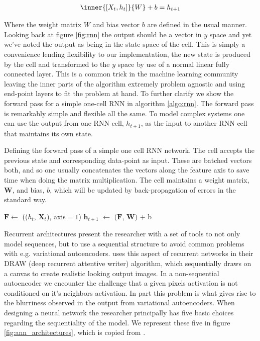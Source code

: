 \begin{align}\label{eq:rnn}
\inner{[X_t, h_t]}{W} + b = h_{t+1}
\end{align}

\noindent Where the weight matrix $W$ and bias vector $b$ are defined in the usual manner. Looking back at figure \ref{fig:rnn} the output should be a vector in $y$ space and yet we've noted the output as being in the state space of the cell. This is simply a convenience lending flexibility to our implementation, the new state is produced by the cell and transformed to the $y$ space by use of a normal linear fully connected layer. This is a common trick in the machine learning community leaving the inner parts of the algorithm extremely problem agnostic and using end-point layers to fit the problem at hand. To further clarify we show the forward pass for a simple one-cell RNN in algorithm \ref{algo:rnn}. The forward pass is remarkably simple and flexible all the same. To model complex systems one can use the output from one RNN cell, $h_{t+1}$, as the input to another RNN cell that maintains its own state. 

\begin{algorithm}[H]
\SetAlgoLined
\caption{Defining the forward pass of a simple one cell RNN network. The cell accepts the previous state and corresponding data-point as input. These are batched vectors both, and so one usually concatenates the vectors along the feature axis to save time when doing the matrix multiplication. The cell maintains a weight matrix, $\mathbf{W}$, and bias, $b$, which will be updated by back-propagation of errors in the standard way.}\label{algo:rnn}
$\mathbf{F} \gets$ (($h_t$, $\mathbf{X}_t$), axis$=1$)\;
$\mathbf{h}_{t+1}$ $\gets$ ($\mathbf{F}$, $\mathbf{W}$) + b\;
\end{algorithm}

\noindent Recurrent architectures present the researcher with a set of tools to not only model sequences, but to use a sequential structure to avoid common problems with e.g. variational autoencoders. \citet{Gregor2015} uses this aspect of recurrent networks in their DRAW (deep recurrent attentive writer) algorithm, which sequentially draws on a canvas to create realistic looking output images. In a non-sequential autoencoder we encounter the challenge that a given pixels activation is not conditioned on it's neighbors activation. In part this problem is what gives rise to the blurriness observed in the output from variational autoencoders. When designing a neural network the researcher principally has five basic choices regarding the sequentiality of the model. We represent these five in figure \ref{fig:ann_architectures}, which is copied from \citet{Karpathy2015}.

